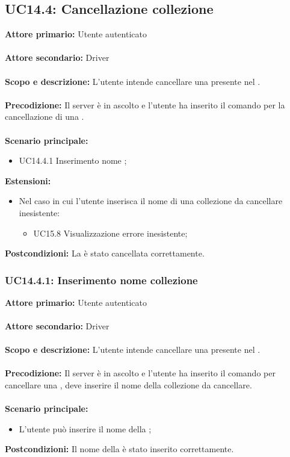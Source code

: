 \documentclass{scalatekids-article}
\begin{document}
\subsection{UC14.4: Cancellazione collezione}

\textbf{Attore primario:} Utente autenticato\\ \\
\textbf{Attore secondario:} Driver\\ \\
\textbf{Scopo e descrizione:} L’utente intende cancellare una  presente nel .\\ \\
\textbf{Precodizione:} Il server è in ascolto e l’utente ha inserito il comando per la cancellazione di una .\\ \\
\textbf{Scenario principale:}
\begin{itemize}
\item UC14.4.1 Inserimento nome ;
\end{itemize}
\textbf{Estensioni:}
\begin{itemize}
\item Nel caso in cui l'utente inserisca il nome di una collezione da cancellare inesistente:
  \begin{itemize}
  \item UC15.8 Visualizzazione errore  inesistente;
  \end{itemize}
\end{itemize}
\textbf{Postcondizioni:} La  è stato cancellata correttamente.

\subsubsection{UC14.4.1: Inserimento nome collezione}

\textbf{Attore primario:} Utente autenticato\\ \\
\textbf{Attore secondario:} Driver\\ \\
\textbf{Scopo e descrizione:} L’utente intende cancellare una  presente nel .\\ \\
\textbf{Precodizione:} Il server è in ascolto e l’utente ha inserito il comando per cancellare una , deve inserire il nome della collezione da cancellare.\\ \\
\textbf{Scenario principale:}
\begin{itemize}
\item L'utente può inserire il nome della ;
\end{itemize}
\textbf{Postcondizioni:} Il nome della  è stato inserito correttamente.
\end{document}
